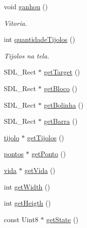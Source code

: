 \begin{DoxyCompactItemize}
void \hyperlink{classview_abbf5bc2a4455e61eb8155f8256a5d870}{ganhou} ()
\begin{DoxyCompactList}\small\item\em Vitoria. \end{DoxyCompactList}\item 
int \hyperlink{classview_a257d50065961954053fbf5402b2e2968}{quantidade\+Tijolos} ()
\begin{DoxyCompactList}\small\item\em Tijolos na tela. \end{DoxyCompactList}\item 
S\+D\+L\+\_\+\+Rect $\ast$ \hyperlink{classview_a4bf37f4171f4bb15c0e5b4ab8c2a9faa}{get\+Target} ()
\item 
S\+D\+L\+\_\+\+Rect $\ast$ \hyperlink{classview_a8b12f1f06de39d6e9f70f54a9281e05c}{get\+Bloco} ()
\item 
S\+D\+L\+\_\+\+Rect $\ast$ \hyperlink{classview_a8eb9d89d9b55a5d2ee529c96e0dc246a}{get\+Bolinha} ()
\item 
S\+D\+L\+\_\+\+Rect $\ast$ \hyperlink{classview_a57b60e5da21e0484081d71c69ba4d03e}{get\+Barra} ()
\item 
\hyperlink{classtijolo}{tijolo} $\ast$ \hyperlink{classview_ab159a52c699a49119e7dfd78384af275}{get\+Tijolos} ()
\item 
\hyperlink{classpontos}{pontos} $\ast$ \hyperlink{classview_a6cd53aa4df2642579992803a18f0bc8b}{get\+Ponto} ()
\item 
\hyperlink{classvida}{vida} $\ast$ \hyperlink{classview_aa33f3e6bf59ada95ee9fd0bff5af22c0}{get\+Vida} ()
\item 
int \hyperlink{classview_aba1c490d357bb58f4aa9218cb96b42b0}{get\+Width} ()
\item 
int \hyperlink{classview_af2cf0c4a4d7cd84f0155ae1ad6a51d0a}{get\+Heigth} ()
\item 
const Uint8 $\ast$ \hyperlink{classview_a5dd0f6c8f5d5f9123353986607c7fb77}{get\+State} ()
\end{DoxyCompactItemize}
